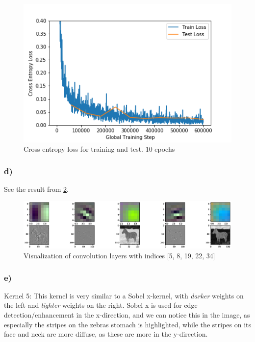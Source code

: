 \begin{figure}[]
    \centering
    \includegraphics[width=1.00\textwidth]{figures/image_processed/task2_c.png}
    \caption{Cross entropy loss for training and test. 10 epochs}
    \label{fig:task2c}
\end{figure}


\subsubsection*{d)}
See the result from \cref{fig:task2d}. 

\begin{figure}[]
    \centering
    \includegraphics[width=1.00\textwidth]{figures/task2d_image.eps}
    \caption{Visualization of convolution layers with indices [5, 8, 19, 22, 34]}
    \label{fig:task2d}
\end{figure}

\subsubsection*{e)}
Kernel 5: 
This kernel is very similar to a Sobel x-kernel, with \textit{darker} weights on the left and \textit{lighter} weights on the right. Sobel x is used for edge detection/enhancement in the x-direction, and we can notice this in the image, as especially the stripes on the zebras stomach is highlighted, while the stripes on its face and neck are more diffuse, as these are more in the y-direction. 

